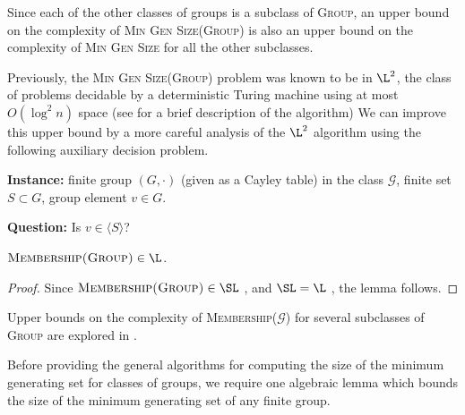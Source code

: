 \documentclass{article}
\newcommand{\gen}[1]{{\langle #1 \rangle}}
\begin{document}
Since each of the other classes of groups is a subclass of \textsc{Group}, an upper bound on the complexity of \textsc{Min Gen Size(Group)} is also an upper bound on the complexity of \textsc{Min Gen Size} for all the other subclasses.

Previously, the \textsc{Min Gen Size(Group)} problem was known to be in $\L^2$, the class of problems decidable by a deterministic Turing machine using at most $O(\log^2 n)$ space \cite{lsz77} (see \cite[Proposition~3]{at06} for a brief description of the algorithm)
We can improve this upper bound by a more careful analysis of the $\L^2$ algorithm using the following auxiliary decision problem.

\begin{definition}
  \mbox{}

  \textbf{Instance:} finite group $(G, \cdot)$ (given as a Cayley table) in the class $\mathcal{G}$, finite set $S \subset G$, group element $v \in G$.

  \textbf{Question:} Is $v \in \gen{S}$?
\end{definition}

\begin{lemma}\label{lem:membershipinl}
  $\textsc{Membership(Group)} \in \L$.
\end{lemma}
\begin{proof}
  Since $\textsc{Membership(Group)} \in \SL$ \cite[Section~3]{bm89}, and $\SL = \L$ \cite{reingold08}, the lemma follows.
\end{proof}

Upper bounds on the complexity of \textsc{Membership($\mathcal{G}$)} for several subclasses of \textsc{Group} are explored in \cite{bklm01}.

Before providing the general algorithms for computing the size of the minimum generating set for classes of groups, we require one algebraic lemma which bounds the size of the minimum generating set of any finite group.
\end{document}
